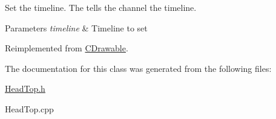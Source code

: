Set the timeline. The tells the channel the timeline. 


\begin{DoxyParams}{Parameters}
{\em timeline} & Timeline to set \\
\hline
\end{DoxyParams}


Reimplemented from \hyperlink{class_c_drawable_a479df46ae298bf716d96b05b1ba6e529}{C\+Drawable}.



The documentation for this class was generated from the following files\+:\begin{DoxyCompactItemize}
\item 
\hyperlink{_head_top_8h}{Head\+Top.\+h}\item 
Head\+Top.\+cpp\end{DoxyCompactItemize}
